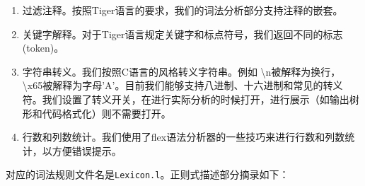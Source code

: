 \begin{enumerate}
\item 过滤注释。按照Tiger语言的要求，我们的词法分析部分支持注释的嵌套。
\item 关键字解释。对于Tiger语言规定关键字和标点符号，我们返回不同的标志(token)。
\item 字符串转义。我们按照C语言的风格转义字符串。例如
\textbackslash n被解释为换行，
\textbackslash x65被解释为字母'A'。目前我们能够支持八进制、十六进制和常见的转义符。我们设置了转义开关，在进行实际分析的时候打开，进行展示（如输出树形和代码格式化）则不需要打开。
\item 行数和列数统计。我们使用了flex语法分析器的一些技巧来进行行数和列数统计，以方便错误提示。
\end{enumerate}

对应的词法规则文件名是\texttt{Lexicon.l}。正则式描述部分摘录如下：

